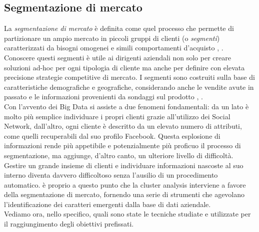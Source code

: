\subsection{Segmentazione di mercato}
La \textit{segmentazione di mercato} \`e definita come quel processo che permette di partizionare un ampio mercato in piccoli gruppi di clienti (o \textit{segmenti}) caratterizzati da bisogni omogenei e simili comportamenti d'acquisto \cite{Myers96}, \cite{Smith56}. Conoscere questi segmenti \`e utile ai dirigenti aziendali non solo per creare soluzioni ad-hoc per ogni tipologia di cliente ma anche per definire con elevata precisione strategie competitive di mercato. I segmenti sono costruiti sulla base di caratteristiche demografiche e geografiche, considerando anche le vendite avute in passato e le informazioni provenienti da sondaggi sul prodotto \cite{Anderson03}, \cite{Aaker13}.\\
Con l'avvento dei Big Data si assiste a due fenomeni fondamentali: da un lato \`e molto pi\`u semplice individuare i propri clienti grazie all'utilizzo dei Social Network, dall'altro, ogni cliente \`e descritto da un elevato numero di attributi, come quelli recuperabili dal suo profilo Facebook. Questa esplosione di informazioni rende pi\`u appetibile e potenzialmente pi\`u proficuo il processo di segmentazione, ma aggiunge, d'altro canto, un ulteriore livello di difficolt\`a. Gestire un grande insieme di clienti e individuare informazioni nascoste al suo interno diventa davvero difficoltoso senza l'ausilio di un procedimento automatico. \`e proprio a questo punto che la cluster analysis interviene a favore della segmentazione di mercato, fornendo una serie di strumenti che agevolano l'identificazione dei caratteri emergenti dalla base di dati aziendale.\\
Vediamo ora, nello specifico, quali sono state le tecniche studiate e utilizzate per il raggiungimento degli obiettivi prefissati.

